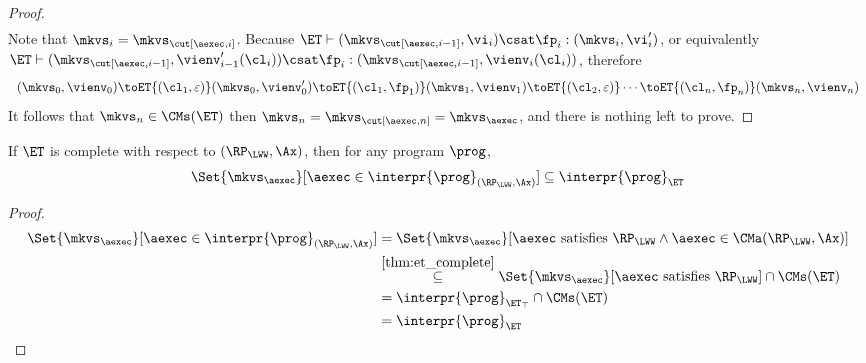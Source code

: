 \begin{proof}
\[\begin{array}{l}
\end{array}
\]
Note that \(\mkvs_{i} = \mkvs_{\cut[\aexec, i]}\). 
Because \(\ET \vdash ( \mkvs_{\cut[\aexec,i-1]}, \vi_i ) \csat \fp_{i} : (\mkvs_{i}, \vi'_{i})\), 
or equivalently \(\ET \vdash ( \mkvs_{\cut[\aexec, i-1]}, \vienv'_{i-1}(\cl_{i}) ) \csat \fp_{i} : ( \mkvs_{\cut[\aexec, i-1]}, \vienv_{i}(\cl_{i}) )\), therefore 
\[
\begin{array}{l}
(\mkvs_{0}, \vienv_{0}) \toET{(\cl_{1}, \varepsilon)} (\mkvs_{0}, \vienv'_{0}) 
\toET{(\cl_{1}, \fp_{1})} (\mkvs_{1}, \vienv_{1})
\toET{(\cl_{2}, \varepsilon)}
\cdots \toET{(\cl_{n}, \fp_{n})} (\mkvs_{n}, \vienv_{n})
\end{array}
\]
It follows that \(\mkvs_{n} \in \CMs(\ET)\) then \(\mkvs_{n} = \mkvs_{\cut[\aexec, n]} = \mkvs_{\aexec}\), and there is nothing left to prove.
\end{proof}

\begin{corollary}
\label{cor:et-completeness}
If \(\ET\) is complete with respect to \((\RP_{\LWW}, \Ax)\), then 
for any program \(\prog\), 
\[\Set{ \mkvs_{\aexec} }[ \aexec \in \interpr{\prog}_{(\RP_{\LWW}, \Ax)} ] \subseteq \interpr{\prog}_{\ET}\]
\end{corollary}
\begin{proof}
\begin{align*}
\Set{ \mkvs_{\aexec} }[ \aexec \in \interpr{\prog}_{(\RP_{\LWW}, \Ax)} ]
& \stackrel{%
}{=} 
\Set{\mkvs_{\aexec} }[ \aexec \text{ satisfies } \RP_{\LWW} \land \aexec \in \CMa(\RP_{\LWW}, \Ax) ] \\
& \stackrel{\cref{thm:et_complete}}{\subseteq} 
\Set{\mkvs_{\aexec} }[ \aexec \text{ satisfies } \RP_{\LWW}] \cap \CMs(\ET) \\
& \stackrel{%
}{=} 
\interpr{\prog}_{\ET_\top} \cap \CMs(\ET) \\
& \stackrel{%
}{=} 
\interpr{\prog}_{\ET} 
\end{align*}
\end{proof}
